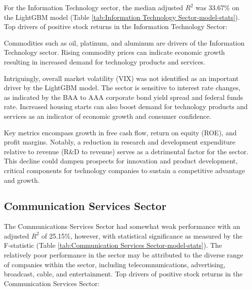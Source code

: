 \documentclass[12pt,a4paper,english]{article}
\begin{document}
For the Information Technology sector, the median adjusted $R^2$ was 33.67\% on the LightGBM model (Table \ref{tab:Information Technology Sector-model-stats}). Top drivers of positive stock returns in the Information Technology Sector:


Commodities such as oil, platinum, and aluminum are drivers of the Information Technology sector. Rising commodity prices can indicate economic growth resulting in increased demand for technology products and services.

Intriguingly, overall market volatility (VIX) was not identified as an important driver by the LightGBM model. The sector is sensitive to interest rate changes, as indicated by the BAA to AAA corporate bond yield spread and federal funds rate. Increased housing starts can also boost demand for technology products and services as an indicator of economic growth and consumer confidence.

Key metrics encompass growth in free cash flow, return on equity (ROE), and profit margins. Notably, a reduction in research and development expenditure relative to revenue (R\&D to revenue) serves as a detrimental factor for the sector. This decline could dampen prospects for innovation and product development, critical components for technology companies to sustain a competitive advantage and growth.

\subsection{Communication Services Sector}
\label{sec:comm}

The Communications Services Sector had somewhat weak performance with an adjusted $R^2$ of 25.15\%, however, with statistical significance as measured by the F-statistic (Table \ref{tab:Communication Services Sector-model-stats}). The relatively poor performance in the sector may be attributed to the diverse range of companies within the sector, including telecommunications, advertising, broadcast, cable, and entertainment. Top drivers of positive stock returns in the Communication Services Sector:
\end{document}
